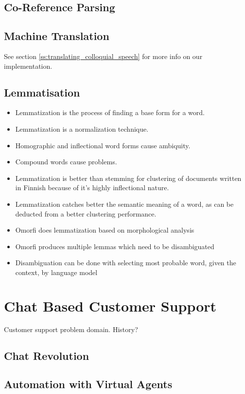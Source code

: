 \documentclass[12pt,a4paper,english
]{tutthesis}
\begin{document}
\section{Co-Reference Parsing}
\label{se:co-reference_parsing}

\section{Machine Translation}
\label{se:machine_translation}
See section \ref{ss:translating_colloquial_speech} for more info on our implementation.

\section{Lemmatisation}
\label{se:lemmatisation}
\begin{itemize}
\item Lemmatization is the process of finding a base form for a word.
\item Lemmatization is a normalization technique. \cite{Korenius2004}
\item Homographic and inflectional word forms cause ambiquity. \cite{Korenius2004}
\item Compound words cause problems. \cite{Korenius2004}
\item Lemmatization is better than stemming for clustering of documents written in Finnish because of it's highly inflectional nature. \cite{Korenius2004}
\item Lemmatization catches better the semantic meaning of a word, as can be deducted from a better clustering performance.
\item Omorfi does lemmatization based on morphological analysis
\item Omorfi produces multiple lemmas which need to be disambiguated
\item Disambiguation can be done with selecting most probable word, given the context, by language model
\end{itemize}


\chapter{Chat Based Customer Support}
\label{ch:chat_based_customer_support}
Customer support problem domain. History?
\section{Chat Revolution}
\section{Automation with Virtual Agents}
\end{document}

